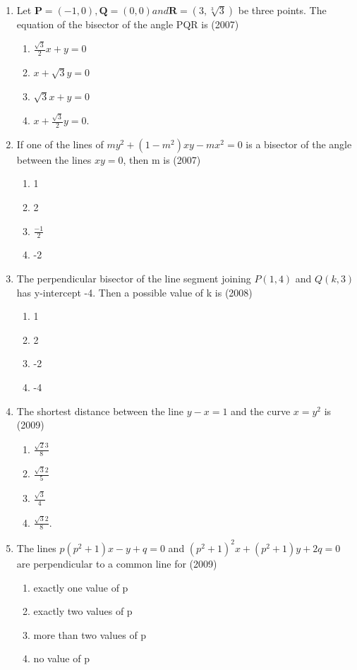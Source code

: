 \documentclass[12pt]{article}
\let\vec\mathbf
\begin{document}
\begin{enumerate}
\item Let $\vec{P}=(-1,0),\vec{Q}=(0,0) and \vec{R}=(3,\sqrt[3]{3})$ be three points. The equation of the bisector of the angle PQR is (2007)
\begin{enumerate}
\item $\frac{\sqrt{3}}{2}x+y=0$ 
\item $x+\sqrt{3}y=0$ 
\item $\sqrt{3}x+y=0$ 
\item $x+\frac{\sqrt{3}}{2}y=0$.
\end{enumerate}
\item If one of the lines of $my^2+(1-m^2)xy-mx^2=0$ is a bisector of the angle between the lines $xy=0$, then m is (2007)
\begin{enumerate}
\item 1  
\item 2 
\item $\frac{-1}{2}$ 
\item -2
\end{enumerate}
\item The perpendicular bisector of the line segment joining $P(1,4)$ and $Q(k,3)$ has y-intercept -4. Then a possible value of k is (2008)
\begin{enumerate}
\item  1 
\item  2 
\item -2 
\item -4
\end{enumerate}
\item The shortest distance between the line $y-x=1$ and the curve $x=y^2$ is (2009)
\begin{enumerate}
\item $\frac{\sqrt{2}{3}}{8}$ 
\item $\frac{\sqrt{3}{2}}{5}$ 
\item $\frac{\sqrt{3}}{4}$ 
\item $\frac{\sqrt{3}{2}}{8}$.
\end{enumerate}
\item The lines $p(p^2+1)x-y+q=0$ and $(p^2+1)^2x+(p^2+1)y+2q=0$ are perpendicular to a common line for (2009)
\begin{enumerate}
\item exactly one value of p
\item exactly two values of p
\item more than two values of p
\item no value of p
\end{enumerate}

\end{enumerate}
\end{document}
